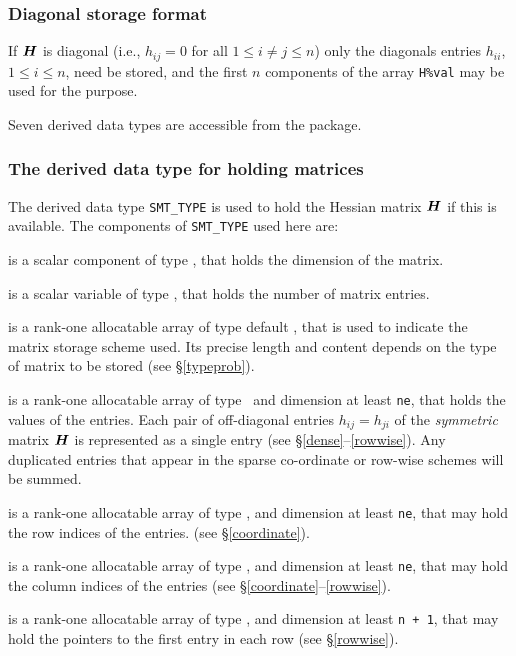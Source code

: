 \documentclass{galahad}
\begin{document}
\subsubsection{Diagonal storage format}\label{diagonal}
If ${\bm{H}}$ is diagonal (i.e., $h_{ij} = 0$ for all $1 \leq i \neq j \leq n$)
only the diagonals entries $h_{ii}$, $1 \leq i \leq n$,  need be stored,
and the first $n$ components of the array {\tt H\%val} may be used for
the purpose.





\galtypes
Seven derived data types are accessible from the package.


\subsubsection{The derived data type for holding matrices}\label{typesmt}
The derived data type {\tt SMT\_TYPE} is used to hold the Hessian matrix ${\bm{H}}$
if this is available. The components of {\tt SMT\_TYPE} used here are:

\begin{description}

 is a scalar component of type \integer,
that holds the dimension of the matrix.

 is a scalar variable of type \integer, that
holds the number of matrix entries.

 is a rank-one allocatable array of type default \character, that
is used to indicate the matrix storage scheme used. Its precise length and
content depends on the type of matrix to be stored (see \S\ref{typeprob}).

 is a rank-one allocatable array of type \realdp\,
and dimension at least {\tt ne}, that holds the values of the entries.
Each pair of off-diagonal entries $h_{ij} = h_{ji}$ of the {\em symmetric}
matrix ${\bm{H}}$ is represented as a single entry
(see \S\ref{dense}--\ref{rowwise}).
Any duplicated entries that appear in the sparse
co-ordinate or row-wise schemes will be summed.

 is a rank-one allocatable array of type \integer,
and dimension at least {\tt ne}, that may hold the row indices of the entries.
(see \S\ref{coordinate}).

 is a rank-one allocatable array of type \integer,
and dimension at least {\tt ne}, that may hold the column indices of the entries
(see \S\ref{coordinate}--\ref{rowwise}).

 is a rank-one allocatable array of type \integer,
and dimension at least {\tt n + 1}, that may hold the pointers to
the first entry in each row (see \S\ref{rowwise}).

\end{description}
\end{document}
